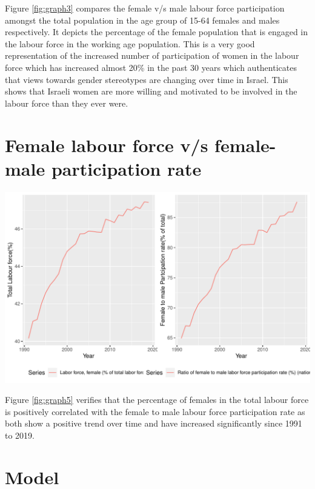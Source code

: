 \documentclass[11pt,a4paper,]{article}
\let\origfigure\figure
\let\endorigfigure\endfigure
\renewenvironment{figure}[1][2] {
    \expandafter\origfigure\expandafter[H]
} {
    \endorigfigure
}%
\begin{document}
Figure \ref{fig:graph3} compares the female v/s male labour force participation amongst the total population in the age group of 15-64 females and males respectively. It depicts the percentage of the female population that is engaged in the labour force in the working age population. This is a very good representation of the increased number of participation of women in the labour force which has increased almost 20\% in the past 30 years which authenticates that views towards gender stereotypes are changing over time in Israel. This shows that Israeli women are more willing and motivated to be involved in the labour force than they ever were.

\hypertarget{female-labour-force-vs-female-male-participation-rate}{%
\section{Female labour force v/s female-male participation rate}\label{female-labour-force-vs-female-male-participation-rate}}

\begin{figure}
\centering
\includegraphics{report_files/figure-latex/graph5-1.pdf}
\caption{\label{fig:graph5}Comparing female labour force with female-male participation rate}
\end{figure}

Figure \ref{fig:graph5} verifies that the percentage of females in the total labour force is positively correlated with the female to male labour force participation rate as both show a positive trend over time and have increased significantly since 1991 to 2019.

\section*{Model}
\end{document}
